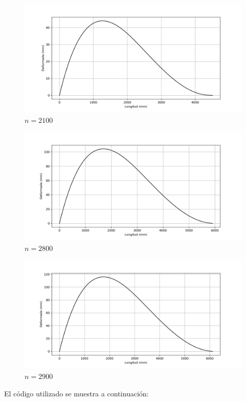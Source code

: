 \documentclass[a4paper,11pt]{report}
\begin{document}
\begin{figure}[H]
\centering
\includegraphics[scale=0.68]{defj2100.png}
\caption{$n = 2100$}
\end{figure}
\begin{figure}[H]
\centering
\includegraphics[scale=0.68]{defj2800.png}
\caption{$n = 2800$}
\end{figure}
\begin{figure}[H]
\centering
\includegraphics[scale=0.68]{defj2900.png}
\caption{$n = 2900$}
\end{figure}
El código utilizado se muestra a continuación:
\end{document}
